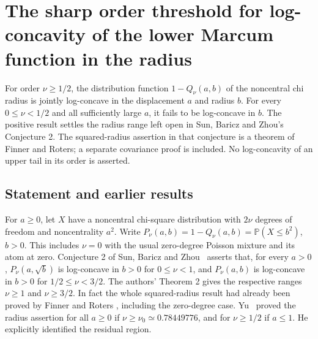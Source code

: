 \documentclass[11pt,a4paper]{article}
\numberwithin{equation}{section}
\theoremstyle{definition}
\theoremstyle{remark}
\newenvironment{sectionabstract}{\par\smallskip\begingroup\small\noindent}{\par\endgroup\medskip}
\begin{document}
\par\endgroup

\begingroup
\newcommand{\Prb}{\mathbb P}
\newcommand{\E}{\mathbb E}
\newcommand{\Var}{\operatorname{Var}}
\newcommand{\Cov}{\operatorname{Cov}}
\section{\texorpdfstring{The sharp order threshold for log-concavity of the lower Marcum function in the radius}{The sharp order threshold for log-concavity of the lower Marcum function in the radius}}\label{section:r36heisei}
\par\medskip


\begin{sectionabstract}
For order \(\nu\ge1/2\), the distribution function \(1-Q_\nu(a,b)\) of the
noncentral chi radius is jointly log-concave in the displacement \(a\)
and radius \(b\). For every \(0\le\nu<1/2\) and all sufficiently large
\(a\), it fails to be log-concave in \(b\). The positive result settles the
radius range left open in Sun, Baricz and Zhou's Conjecture 2. The
squared-radius assertion in that conjecture is a theorem of Finner and
Roters; a separate covariance proof is included. No log-concavity of an
upper tail in its order is asserted.
\end{sectionabstract}

\subsection{Statement and earlier results}
For \(a\ge0\), let \(X\) have a noncentral chi-square distribution with
\(2\nu\) degrees of freedom and noncentrality \(a^2\). Write
\(P_\nu(a,b)=1-Q_\nu(a,b)=\Prb(X\le b^2)\), \(b>0\).
This includes \(\nu=0\) with the usual zero-degree Poisson mixture and
its atom at zero. Conjecture 2 of Sun, Baricz and Zhou~\cite{r36heisei:SBZ}
asserts that, for every \(a>0\), \(P_\nu(a,\sqrt b)\) is log-concave
in \(b>0\) for \(0\le\nu<1\), and \(P_\nu(a,b)\) is log-concave in
\(b>0\) for \(1/2\le\nu<3/2\). The authors' Theorem 2 gives the
respective ranges \(\nu\ge1\) and \(\nu\ge3/2\). In fact the whole
squared-radius result had already been proved by Finner and Roters
\cite[Theorem 3.4]{r36heisei:FR}, including the zero-degree case.
Yu~\cite[Corollary 1]{r36heisei:Yu} proved the radius assertion for all \(a\ge0\)
if \(\nu\ge\nu_0\simeq0.78449776\), and for \(\nu\ge1/2\) if
\(a\le1\). He explicitly identified the residual region.
\end{document}
